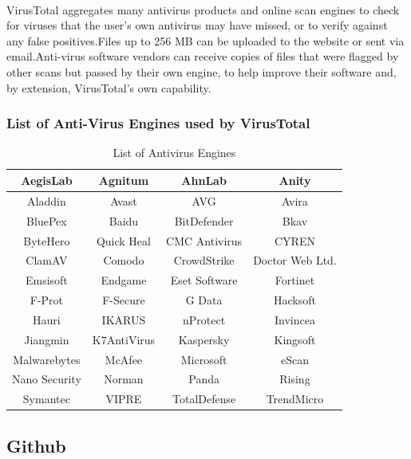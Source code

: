 \documentclass{article}
\begin{document}
\paragraph{}
VirusTotal aggregates many antivirus products and online scan engines to check for viruses that the user's own antivirus may have missed, or to verify against any false positives.Files up to 256 MB can be uploaded to the website or sent via email.Anti-virus software vendors can receive copies of files that were flagged by other scans but passed by their own engine, to help improve their software and, by extension, VirusTotal's own capability. 

\subsubsection{List of Anti-Virus Engines used by VirusTotal}


\begin{table}[h!]
\begin{center}

\begin{tabular}{ |c|c|c|c| } 
 \hline
 AegisLab & Agnitum & AhnLab & Anity\\
 \hline
 Aladdin & Avast & AVG  & Avira \\
 \hline
 BluePex  & Baidu  & BitDefender & Bkav  \\
 \hline
 ByteHero & Quick Heal & CMC Antivirus & CYREN \\
 \hline
 ClamAV  & Comodo & CrowdStrike & Doctor Web Ltd. \\
 \hline
 Emsisoft & Endgame & Eset Software & Fortinet \\
 \hline
 F-Prot  & F-Secure & G Data & Hacksoft \\
 \hline
 Hauri  & IKARUS & nProtect & Invincea  \\
 \hline
 Jiangmin & K7AntiVirus & Kaspersky & Kingsoft\\
 \hline
 Malwarebytes  & McAfee & Microsoft & eScan \\
 \hline
 Nano Security  & Norman & Panda & Rising \\
 \hline
  Symantec  & VIPRE & TotalDefense & TrendMicro \\
 \hline
 
 
 \hline
\end{tabular}
\caption{List of Antivirus Engines}
\end{center}
\end{table}

\subsection{Github}
\end{document}
